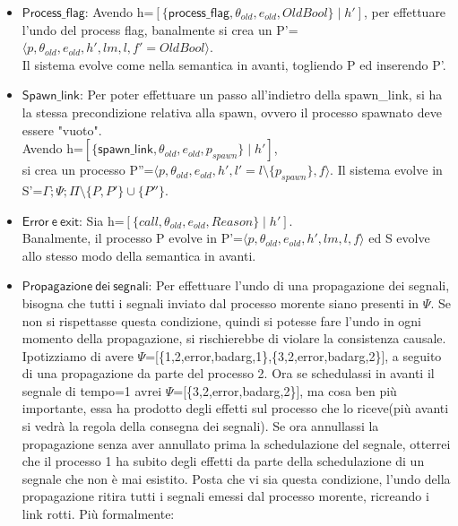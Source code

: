 \documentclass[Contributo.tex]{subfiles}
\begin{document}
	\begin{itemize}
		\item $\mathsf{Process\_flag}$: Avendo h=$\displaystyle [\{\mathsf{process\_flag},\theta_{old},e_{old},OldBool\} \mid h']$, per effettuare l'undo del process flag, banalmente si crea un P'= $\displaystyle \langle p,\theta_{old},e_{old},h',lm,l,f'=OldBool \rangle$.\\
		Il sistema evolve come nella semantica in avanti, togliendo P ed inserendo P'.
		\item $\mathsf{Spawn\_link}$:
		Per poter effettuare un passo all'indietro della spawn\_link, si ha la stessa precondizione relativa alla spawn, ovvero il processo spawnato deve essere "vuoto". \\
		Avendo h=$\displaystyle [\{\mathsf{spawn\_link},\theta_{old},e_{old},p_{spawn}\} \mid h']$,\\
		si crea un processo P''=$\displaystyle \langle p,\theta_{old},e_{old},h',l'=l \setminus \{p_{spawn}\},f \rangle$.
		Il sistema evolve in S'=$\displaystyle \Gamma;\Psi;\Pi\setminus\{P,P'\}\cup\{P''\}$.
		\item $\mathsf{Error~e~exit}$: Sia h=$\displaystyle [\{call,\theta_{old},e_{old},Reason\} \mid h']$.\\
		Banalmente, il processo P evolve in P'=$\displaystyle \langle p,\theta_{old},e_{old},h',lm,l,f \rangle$ ed S evolve allo stesso modo della semantica in avanti.
		\item $\mathsf{Propagazione~dei~segnali}$: Per effettuare l'undo di una propagazione dei segnali, bisogna che tutti i segnali inviato dal processo morente siano presenti in $\Psi$.
		Se non si rispettasse questa condizione, quindi si potesse fare l'undo in ogni momento della propagazione, si rischierebbe di violare la consistenza causale.\\
		Ipotizziamo di avere $\Psi$=[\{1,2,error,badarg,1\},\{3,2,error,badarg,2\}], a seguito di una propagazione da parte del processo 2. Ora se schedulassi in avanti il segnale di tempo=1 avrei $\Psi$=[\{3,2,error,badarg,2\}], ma cosa ben più importante, essa ha prodotto degli effetti sul processo che lo riceve(più avanti si vedrà la regola della consegna dei segnali). Se ora annullassi la propagazione senza aver annullato prima la schedulazione del segnale, otterrei che il processo 1 ha subito degli effetti da parte della schedulazione di un segnale che non è mai esistito.
		Posta che vi sia questa condizione, l'undo della propagazione ritira tutti i segnali emessi dal processo morente, ricreando i link rotti.
		Più formalmente:\\

\end{itemize}
\end{document}
